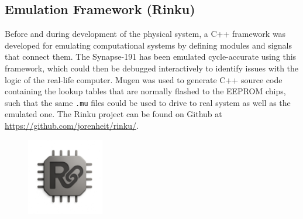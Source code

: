 \subsection{Emulation Framework (Rinku)}
Before and during development of the physical system, a C++ framework was developed for emulating computational systems by defining modules and signals that connect them. The Synapse-191 has been emulated cycle-accurate using this framework, which could then be debugged interactively to identify issues with the logic of the real-life computer. Mugen was used to generate C++ source code containing the lookup tables that are normally flashed to the EEPROM chips, such that the same \texttt{.mu} files could be used to drive to real system as well as the emulated one. The Rinku project can be found on Github at \url{https://github.com/jorenheit/rinku/}.

\begin{figure}[H]
  \centering
  \includegraphics[width=0.3\textwidth]{img/rinku_logo}
\end{figure}
